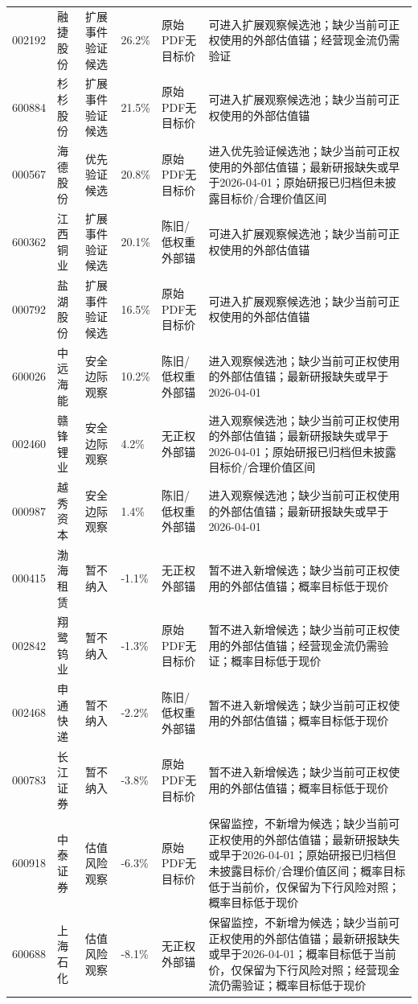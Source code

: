 \begin{longtable}{L{1.0cm}L{1.55cm}L{2.1cm}R{1.0cm}L{2.4cm}L{5.3cm}}
002192 & 融捷股份 & 扩展事件验证候选 & 26.2\% & 原始PDF无目标价 & 可进入扩展观察候选池；缺少当前可正权使用的外部估值锚；经营现金流仍需验证 \\
600884 & 杉杉股份 & 扩展事件验证候选 & 21.5\% & 原始PDF无目标价 & 可进入扩展观察候选池；缺少当前可正权使用的外部估值锚 \\
000567 & 海德股份 & 优先验证候选 & 20.8\% & 原始PDF无目标价 & 进入优先验证候选池；缺少当前可正权使用的外部估值锚；最新研报缺失或早于2026-04-01；原始研报已归档但未披露目标价/合理价值区间 \\
600362 & 江西铜业 & 扩展事件验证候选 & 20.1\% & 陈旧/低权重外部锚 & 可进入扩展观察候选池；缺少当前可正权使用的外部估值锚 \\
000792 & 盐湖股份 & 扩展事件验证候选 & 16.5\% & 原始PDF无目标价 & 可进入扩展观察候选池；缺少当前可正权使用的外部估值锚 \\
600026 & 中远海能 & 安全边际观察 & 10.2\% & 陈旧/低权重外部锚 & 进入观察候选池；缺少当前可正权使用的外部估值锚；最新研报缺失或早于2026-04-01 \\
002460 & 赣锋锂业 & 安全边际观察 & 4.2\% & 无正权外部锚 & 进入观察候选池；缺少当前可正权使用的外部估值锚；最新研报缺失或早于2026-04-01；原始研报已归档但未披露目标价/合理价值区间 \\
000987 & 越秀资本 & 安全边际观察 & 1.4\% & 陈旧/低权重外部锚 & 进入观察候选池；缺少当前可正权使用的外部估值锚；最新研报缺失或早于2026-04-01 \\
000415 & 渤海租赁 & 暂不纳入 & -1.1\% & 无正权外部锚 & 暂不进入新增候选；缺少当前可正权使用的外部估值锚；概率目标低于现价 \\
002842 & 翔鹭钨业 & 暂不纳入 & -1.3\% & 原始PDF无目标价 & 暂不进入新增候选；缺少当前可正权使用的外部估值锚；经营现金流仍需验证；概率目标低于现价 \\
002468 & 申通快递 & 暂不纳入 & -2.2\% & 陈旧/低权重外部锚 & 暂不进入新增候选；缺少当前可正权使用的外部估值锚；概率目标低于现价 \\
000783 & 长江证券 & 暂不纳入 & -3.8\% & 原始PDF无目标价 & 暂不进入新增候选；缺少当前可正权使用的外部估值锚；概率目标低于现价 \\
600918 & 中泰证券 & 估值风险观察 & -6.3\% & 原始PDF无目标价 & 保留监控，不新增为候选；缺少当前可正权使用的外部估值锚；最新研报缺失或早于2026-04-01；原始研报已归档但未披露目标价/合理价值区间；概率目标低于当前价，仅保留为下行风险对照；概率目标低于现价 \\
600688 & 上海石化 & 估值风险观察 & -8.1\% & 无正权外部锚 & 保留监控，不新增为候选；缺少当前可正权使用的外部估值锚；最新研报缺失或早于2026-04-01；概率目标低于当前价，仅保留为下行风险对照；经营现金流仍需验证；概率目标低于现价 \\

\end{longtable}
